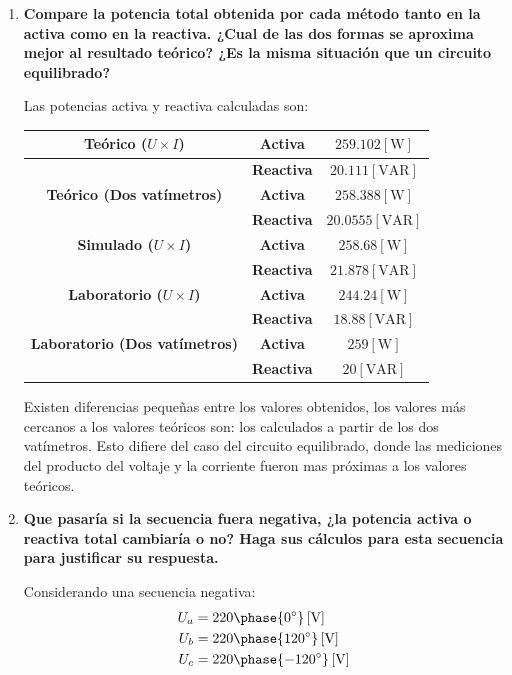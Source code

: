 \documentclass[letter,11pt]{article}
\begin{document}
\begin{enumerate}

\item \textbf{Compare la potencia total obtenida por cada método tanto en la
activa como en la reactiva. ¿Cual de las dos formas se aproxima mejor al
resultado teórico? ¿Es la misma situación que un circuito equilibrado?}

Las potencias activa y reactiva calculadas son:

\begin{center}
    \begin{tabular}{|c|c||c|}
    \hline
    \textbf{Teórico ($U{\times}I$)} & \textbf{Activa} & $259.102[\text{W}]$
    \tabularnewline \hline
                                    & \textbf{Reactiva} & $20.111[\text{VAR}]$
    \tabularnewline \hline \hline
    \textbf{Teórico (Dos vatímetros)} & \textbf{Activa} & $258.388[\text{W}]$
    \tabularnewline \hline
                                      & \textbf{Reactiva} & $20.0555[\text{VAR}]$
    \tabularnewline \hline \hline
    \textbf{Simulado ($U{\times}I$)} & \textbf{Activa} & $258.68[\text{W}]$
    \tabularnewline \hline
                                     & \textbf{Reactiva} & $21.878[\text{VAR}]$
    \tabularnewline \hline \hline
    \textbf{Laboratorio ($U{\times}I$)} & \textbf{Activa} & $244.24[\text{W}]$
    \tabularnewline \hline
                                        & \textbf{Reactiva} & $18.88[\text{VAR}]$
    \tabularnewline \hline \hline
    \textbf{Laboratorio (Dos vatímetros)} & \textbf{Activa} & $259[\text{W}]$
    \tabularnewline \hline
                                          & \textbf{Reactiva} & $20[\text{VAR}]$
    \tabularnewline \hline
    \end{tabular}
\end{center}

Existen diferencias pequeñas entre los valores obtenidos, los valores más
cercanos a los valores teóricos son: los calculados a partir de los dos
vatímetros. Esto difiere del caso del circuito equilibrado, donde las mediciones
del producto del voltaje y la corriente fueron mas próximas a los valores
teóricos.

\item \textbf{Que pasaría si la secuencia fuera negativa, ¿la potencia activa o
reactiva total cambiaría o no? Haga sus cálculos para esta secuencia para
justificar su respuesta.}

Considerando una secuencia negativa:
\begin{equation*}
    \begin{split}
        U_a &= 220\phase{0^{\circ}}\,[\text{V}]\\
        U_b &= 220\phase{120^{\circ}}\,[\text{V}]\\
        U_c &= 220\phase{-120^{\circ}}\,[\text{V}]\\
    \end{split}
\end{equation*}


\end{enumerate}
\end{document}
